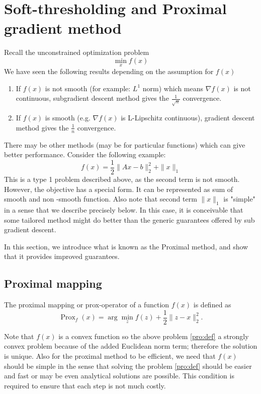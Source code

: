  
\section{Soft-thresholding and Proximal gradient method}
\label{sec:soft-thresholding}
Recall the unconstrained optimization problem
$$
\min _{x} f(x)
$$
We have seen the following results depending on the assumption for $f(x)$
\begin{enumerate}
\item If $f(x)$ is not smooth (for example: $L^1$ norm) which means $\nabla f(x)$ is not continuous, subgradient descent method gives the $\frac{1}{\sqrt{n}}$ convergence.
\item If $f(x)$ is smooth (e.g. $\nabla f(x)$ is L-Lipschitz continuous), gradient descent method gives the $\frac{1}{n}$ convergence. 
\end{enumerate}
There may be other methods (may be for particular functions) which can give better performance. Consider the following example:
$$
f(x)=\frac{1}{2}\|A x-b\|_{2}^{2}+\|x\|_{1}
$$
This is a type 1 problem described above, as the second term is not smooth. However, the objective has a special form. It can be represented as sum of smooth and non -smooth function. Also note that second term $\|x\|_{1}$ is "simple" in a sense that we describe precisely below. In this case, it is conceivable that some tailored method might do better than the generic guarantees offered by sub gradient descent. 

In this section, we introduce what is known as the Proximal method, and show that it provides improved guarantees.  

\subsection{Proximal mapping}\label{sec:proximal}
\begin{definition}
The proximal mapping or prox-operator of a function $f(x)$ is defined as
\begin{equation}\label{pro:def}
\operatorname{Prox}_{f}(x)=\arg \min _{z}f(z)+\frac{1}{2}\|z-x\|_{2}^{2}.
\end{equation}
\end{definition}
Note that $f(x)$ is a convex function so the above problem \eqref{pro:def} a strongly convex problem because of the added Euclidean norm term; therefore the solution is unique. Also for the proximal method to be efficient, we need that $f(x)$ should be simple in the sense that solving the problem \eqref{pro:def}  should be easier and fast or may be even analytical solutions are possible. This condition is required to ensure that each step is not much costly. 

